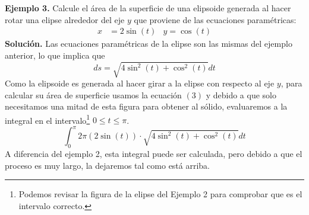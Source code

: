 \documentclass[12pt]{article}
\begin{document}
\textbf{Ejemplo 3.} Calcule el área de la superficie de una elipsoide generada al hacer rotar una elipse alrededor del eje $y$ que proviene de las ecuaciones paramétricas:
\begin{align*}
  x &= 2 \sin(t) & y = \cos(t)
\end{align*}
\textbf{Solución.} Las ecuaciones paramétricas de la elipse son las mismas del ejemplo anterior, lo que implica que
\[
  ds = \sqrt{4\sin^{2}(t) + \cos^{2}(t)} dt
\]
Como la elipsoide es generada al hacer girar a la elipse con respecto al eje $y$, para calcular su área de superficie usamos la ecuación $(3)$ y debido a que solo necesitamos una mitad de esta figura para obtener al sólido, evaluaremos a la integral en el intervalo\footnote{Podemos revisar la figura de la elipse del Ejemplo 2 para comprobar que es el intervalo correcto.} $0 \leq t \leq \pi$.
\[
  \int_{0}^{\pi} 2\pi (2 \sin(t)) \cdot \sqrt{4\sin^{2}(t) + \cos^{2}(t)} dt
\]
A diferencia del ejemplo 2, esta integral puede ser calculada, pero debido a que el proceso es muy largo, la dejaremos tal como está arriba.
\end{document}
